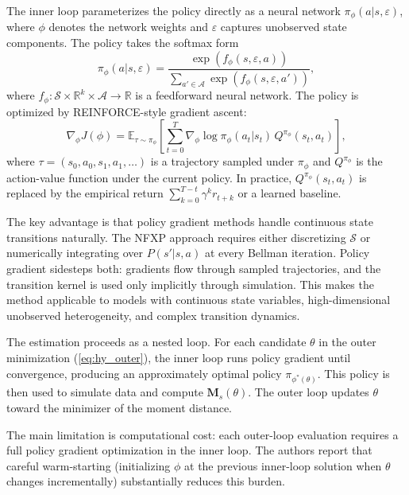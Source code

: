 The inner loop parameterizes the policy directly as a neural network $\pi_\phi(a | s, \varepsilon)$, where $\phi$ denotes the network weights and $\varepsilon$ captures unobserved state components. The policy takes the softmax form
\begin{equation}
\pi_\phi(a | s, \varepsilon) = \frac{\exp\left(f_\phi(s, \varepsilon, a)\right)}{\sum_{a' \in \mathcal{A}} \exp\left(f_\phi(s, \varepsilon, a')\right)}, \label{eq:hy_policy}
\end{equation}
where $f_\phi: \mathcal{S} \times \mathbb{R}^k \times \mathcal{A} \to \mathbb{R}$ is a feedforward neural network. The policy is optimized by REINFORCE-style gradient ascent:
\begin{equation}
\nabla_\phi J(\phi) = \mathbb{E}_{\tau \sim \pi_\phi}\left[\sum_{t=0}^T \nabla_\phi \log \pi_\phi(a_t | s_t) \, Q^{\pi_\phi}(s_t, a_t)\right], \label{eq:hy_pg}
\end{equation}
where $\tau = (s_0, a_0, s_1, a_1, \ldots)$ is a trajectory sampled under $\pi_\phi$ and $Q^{\pi_\phi}$ is the action-value function under the current policy. In practice, $Q^{\pi_\phi}(s_t, a_t)$ is replaced by the empirical return $\sum_{k=0}^{T-t} \gamma^k r_{t+k}$ or a learned baseline.

The key advantage is that policy gradient methods handle continuous state transitions naturally. The NFXP approach requires either discretizing $\mathcal{S}$ or numerically integrating over $P(s'|s,a)$ at every Bellman iteration. Policy gradient sidesteps both: gradients flow through sampled trajectories, and the transition kernel is used only implicitly through simulation. This makes the method applicable to models with continuous state variables, high-dimensional unobserved heterogeneity, and complex transition dynamics.

The estimation proceeds as a nested loop. For each candidate $\theta$ in the outer minimization (\ref{eq:hy_outer}), the inner loop runs policy gradient until convergence, producing an approximately optimal policy $\pi_{\phi^*(\theta)}$. This policy is then used to simulate data and compute $\mathbf{M}_s(\theta)$. The outer loop updates $\theta$ toward the minimizer of the moment distance.

The main limitation is computational cost: each outer-loop evaluation requires a full policy gradient optimization in the inner loop. The authors report that careful warm-starting (initializing $\phi$ at the previous inner-loop solution when $\theta$ changes incrementally) substantially reduces this burden.


